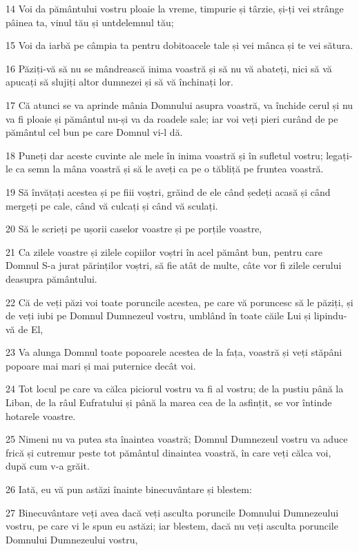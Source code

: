 \par 14 Voi da pământului vostru ploaie la vreme, timpurie și târzie, și-ți vei strânge pâinea ta, vinul tău și untdelemnul tău;
\par 15 Voi da iarbă pe câmpia ta pentru dobitoacele tale și vei mânca și te vei sătura.
\par 16 Păziți-vă să nu se mândrească inima voastră și să nu vă abateți, nici să vă apucați să slujiți altor dumnezei și să vă închinați lor.
\par 17 Că atunci se va aprinde mânia Domnului asupra voastră, va închide cerul și nu va fi ploaie și pământul nu-și va da roadele sale; iar voi veți pieri curând de pe pământul cel bun pe care Domnul vi-l dă.
\par 18 Puneți dar aceste cuvinte ale mele în inima voastră și în sufletul vostru; legați-le ca semn la mâna voastră și să le aveți ca pe o tăbliță pe fruntea voastră.
\par 19 Să învățați acestea și pe fiii voștri, grăind de ele când ședeți acasă și când mergeți pe cale, când vă culcați și când vă sculați.
\par 20 Să le scrieți pe ușorii caselor voastre și pe porțile voastre,
\par 21 Ca zilele voastre și zilele copiilor voștri în acel pământ bun, pentru care Domnul S-a jurat părinților voștri, să fie atât de multe, câte vor fi zilele cerului deasupra pământului.
\par 22 Că de veți păzi voi toate poruncile acestea, pe care vă poruncesc să le păziți, și de veți iubi pe Domnul Dumnezeul vostru, umblând în toate căile Lui și lipindu-vă de El,
\par 23 Va alunga Domnul toate popoarele acestea de la fața, voastră și veți stăpâni popoare mai mari și mai puternice decât voi.
\par 24 Tot locul pe care va călca piciorul vostru va fi al vostru; de la pustiu până la Liban, de la râul Eufratului și până la marea cea de la asfințit, se vor întinde hotarele voastre.
\par 25 Nimeni nu va putea sta înaintea voastră; Domnul Dumnezeul vostru va aduce frică și cutremur peste tot pământul dinaintea voastră, în care veți călca voi, după cum v-a grăit.
\par 26 Iată, eu vă pun astăzi înainte binecuvântare și blestem:
\par 27 Binecuvântare veți avea dacă veți asculta poruncile Domnului Dumnezeului vostru, pe care vi le spun eu astăzi; iar blestem, dacă nu veți asculta poruncile Domnului Dumnezeului vostru,
